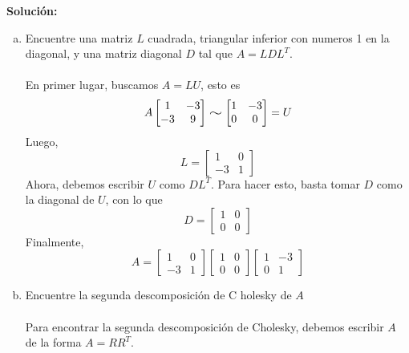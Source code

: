 \documentclass[12pt]{article}
\newenvironment{solucion}
{\begin{mdframed}[backgroundcolor=black!10]
		{\bf Solución:}\\
	}
	{
	\end{mdframed}
}
\newenvironment{preguntas}
{\begin{enumerate}\itemsep12pt
	}
	{
	\end{enumerate}
}
\newcommand{\widesim}[2][1.5]{
	\mathrel{\overset{#2}{\scalebox{#1}[1]{$\sim$}}}
}
\newcommand{\wsim}{\widesim{}}
\begin{document}
\begin{preguntas}
\begin{solucion}
\begin{enumerate}[a)]
\item Encuentre una matriz $L$ cuadrada, triangular inferior con numeros 1 en la diagonal, y una matriz diagonal $D$ tal que $A = LDL^T$.\\
\\
En primer lugar,  buscamos $A = LU$, esto es
$$A \begin{bmatrix}1 & -3 \\ -3 & 9\end{bmatrix} 
\wsim
\begin{bmatrix}1 & -3 \\ 0 & 0\end{bmatrix}
= U$$
Luego,
$$L = \begin{bmatrix}1 & 0 \\ -3 & 1\end{bmatrix}$$
Ahora, debemos escribir $U$ como $DL^T$. Para hacer esto, basta tomar $D$ como la diagonal de $U$, con lo que
$$D = \begin{bmatrix}1 & 0 \\ 0 & 0\end{bmatrix}$$
Finalmente,
$$A = 
\begin{bmatrix}1 & 0 \\ -3 & 1\end{bmatrix}
\begin{bmatrix}1 & 0 \\ 0 & 0\end{bmatrix}
\begin{bmatrix}1 & -3 \\ 0 & 1\end{bmatrix}
$$
\item Encuentre la segunda descomposición de C
holesky de $A$\\
\\
Para encontrar la segunda descomposición de Cholesky, debemos escribir $A$ de la forma $A = RR^T$.\\


\end{enumerate}
\end{solucion}
\end{preguntas}
\end{document}
